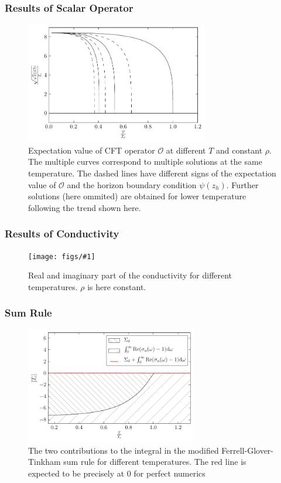 \documentclass{beamer}
\newcommand{\fig}[2]{
\begin{figure}
\centering
\texttt{[image: figs/\#1]}
\caption{#2}
\end{figure}
}
\begin{document}
\begin{frame}
\frametitle{Results of Scalar Operator}
\begin{figure}
\centering
\includegraphics[width=8cm]{figs/O_constRho_a2_0.0.pdf}
\caption{Expectation value of CFT operator $\mathcal{O}$ at different $T$ and constant $\rho$. The multiple curves correspond to multiple solutions at the same temperature. The dashed lines have different signs of the expectation value of $\mathcal{O}$ and the horizon boundary condition $\psi(z_h)$. Further solutions (here ommited) are obtained for lower temperature following the trend shown here.}
\end{figure}
\end{frame}


\begin{frame}
\frametitle{Results of Conductivity}
\fig{cond_Ts_a2_0.0_v2.pdf}{Real and imaginary part of the conductivity for different temperatures. $\rho$ is here constant.\label{f:cond}}
\end{frame}

\begin{frame}
\frametitle{Sum Rule}

\begin{figure}
\centering
\includegraphics[width=7.5cm]{figs/sum_rule_a20}
\caption{The two contributions to the integral in the modified Ferrell-Glover-Tinkham sum rule for different temperatures. The red line is expected to be precisely at 0 for perfect numerics}
\end{figure}
\end{frame}
\end{document}
